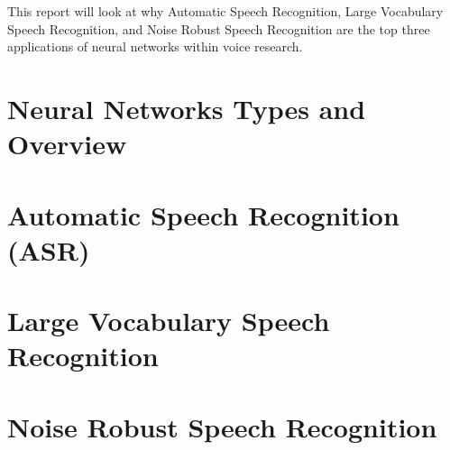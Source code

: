 \documentclass[11pt]{article}
\begin{document}
    This report will look at why Automatic Speech Recognition, Large Vocabulary Speech Recognition, and Noise Robust Speech Recognition are the top three applications of neural networks within voice research.
    
    \section{Neural Networks Types and Overview}
    
    
    
    \section{Automatic Speech Recognition (ASR)}
    
    \section{Large Vocabulary Speech Recognition}
    
    \section{Noise Robust Speech Recognition}

        


\pagebreak

\printbibliography
\end{document}
